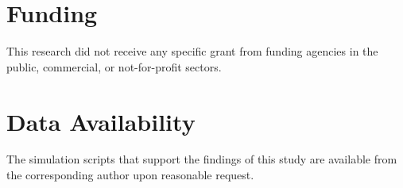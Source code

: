 \documentclass[12pt]{elsarticle}
\theoremstyle{remark}
\begin{document}
\section*{Funding}
This research did not receive any specific grant from funding agencies in the public, commercial, or not-for-profit sectors.
\section*{Data Availability}
The simulation scripts that support the findings of this study are available from the corresponding author upon reasonable request.
\end{document}
